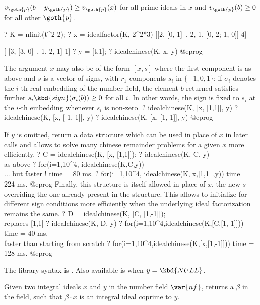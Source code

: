 $v_{\goth{p}}(b - y_{\goth{p}}) \geq v_{\goth{p}}(x)$ for all prime ideals
in $x$ and $v_{\goth{p}}(b)\geq 0$ for all other $\goth{p}$.

\bprog
? K = nfinit(t^2-2);
? x = idealfactor(K, 2^2*3)
[[2, [0, 1]~, 2, 1, [0, 2; 1, 0]] 4]

[           [3, [3, 0]~, 1, 2, 1] 1]
? y = [t,1];
? idealchinese(K, x, y)
@eprog

The argument $x$ may also be of the form $[x, s]$ where the first component
is as above and $s$ is a vector of signs, with $r_1$ components
$s_i$ in $\{-1,0,1\}$:
if $\sigma_i$ denotes the $i$-th real embedding of the number field,
the element $b$ returned satisfies further
$s_i \kbd{sign}(\sigma_i(b)) \geq 0$ for all $i$. In other words, the sign is
fixed to $s_i$ at the $i$-th embedding whenever $s_i$ is non-zero.
\bprog
? idealchinese(K, [x, [1,1]], y)
? idealchinese(K, [x, [-1,-1]], y)
? idealchinese(K, [x, [1,-1]], y)
@eprog

If $y$ is omitted, return a data structure which can be used in
place of $x$ in later calls and allows to solve many chinese remainder
problems for a given $x$ more efficiently.
\bprog
? C = idealchinese(K, [x, [1,1]]);
? idealchinese(K, C, y) \\ as above
? for(i=1,10^4, idealchinese(K,C,y))  \\ ... but faster !
time = 80 ms.
? for(i=1,10^4, idealchinese(K,[x,[1,1]],y))
time = 224 ms.
@eprog
Finally, this structure is itself allowed in place of $x$, the
new $s$ overriding the one already present in the structure. This allows to
initialize for different sign conditions more efficiently when the underlying
ideal factorization remains the same.
\bprog
? D = idealchinese(K, [C, [1,-1]]);   \\ replaces [1,1]
? idealchinese(K, D, y)
? for(i=1,10^4,idealchinese(K,[C,[1,-1]]))
time = 40 ms.   \\ faster than starting from scratch
? for(i=1,10^4,idealchinese(K,[x,[1,-1]]))
time = 128 ms.
@eprog

The library syntax is .
Also available is
 when $y = \kbd{NULL}$.

\label{se:idealcoprime}
Given two integral ideals $x$ and $y$
in the number field $\var{nf}$, returns a $\beta$ in the field,
such that $\beta\cdot x$ is an integral ideal coprime to $y$.

